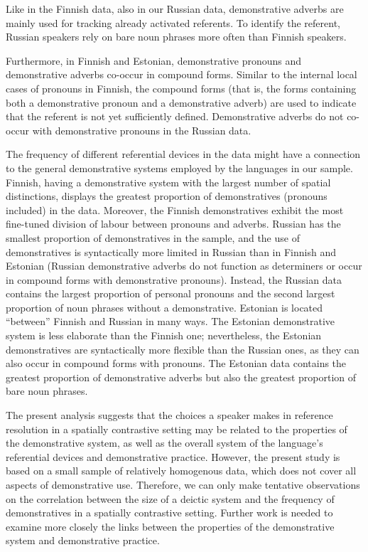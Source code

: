 \documentclass[output=paper,colorlinks,citecolor=brown]{langscibook}
\begin{document}
Like in the Finnish data, also in our Russian data, demonstrative adverbs are mainly used for tracking already activated referents. To identify the referent, Russian speakers rely on bare noun phrases more often than Finnish speakers.

Furthermore, in Finnish and Estonian, demonstrative pronouns and demonstrative adverbs co-occur in compound forms. Similar to the internal local cases of pronouns in Finnish, the compound forms (that is, the forms containing both a demonstrative pronoun and a demonstrative adverb) are used to indicate that the referent is not yet sufficiently defined. Demonstrative adverbs do not co-occur with demonstrative pronouns in the Russian data. 

The frequency of different referential devices in the data might have a connection to the general demonstrative systems employed by the languages in our sample. Finnish, having a demonstrative system with the largest number of spatial distinctions, displays the greatest proportion of demonstratives (pronouns included) in the data. Moreover, the Finnish demonstratives exhibit the most fine-tuned division of labour between pronouns and adverbs. Russian has the smallest proportion of demonstratives in the sample, and the use of demonstratives is syntactically more limited in Russian than in Finnish and Estonian (Russian demonstrative adverbs do not function as determiners or occur in compound forms with demonstrative pronouns). Instead, the Russian data contains the largest proportion of personal pronouns and the second largest proportion of noun phrases without a demonstrative. Estonian is located “between” Finnish and Russian in many ways. The Estonian demonstrative system is less elaborate than the Finnish one; nevertheless, the Estonian demonstratives are syntactically more flexible than the Russian ones, as they can also occur in compound forms with pronouns. The Estonian data contains the greatest proportion of demonstrative adverbs but also the greatest proportion of bare noun phrases. 

The present analysis suggests that the choices a speaker makes in reference resolution in a spatially contrastive setting may be related to the properties of the demonstrative system, as well as the overall system of the language’s referential devices and demonstrative practice. However, the present study is based on a small sample of relatively homogenous data, which does not cover all aspects of demonstrative use. Therefore, we can only make tentative observations on the correlation between the size of a deictic system and the frequency of demonstratives in a spatially contrastive setting. Further work is needed to examine more closely the links between the properties of the demonstrative system and demonstrative practice. 
\end{document}
